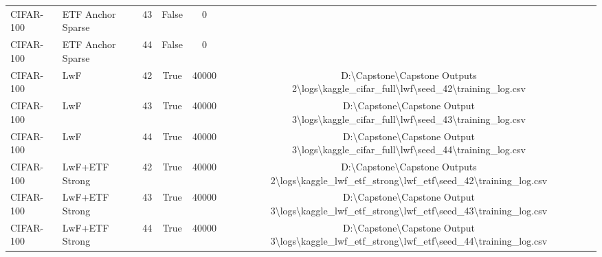 \begin{tabular}{llcccc}
CIFAR-100 & ETF Anchor Sparse & 43 & False & 0 &  \\
CIFAR-100 & ETF Anchor Sparse & 44 & False & 0 &  \\
CIFAR-100 & LwF & 42 & True & 40000 & D:\textbackslash{}Capstone\textbackslash{}Capstone Outputs 2\textbackslash{}logs\textbackslash{}kaggle\_cifar\_full\textbackslash{}lwf\textbackslash{}seed\_42\textbackslash{}training\_log.csv \\
CIFAR-100 & LwF & 43 & True & 40000 & D:\textbackslash{}Capstone\textbackslash{}Capstone Output 3\textbackslash{}logs\textbackslash{}kaggle\_cifar\_full\textbackslash{}lwf\textbackslash{}seed\_43\textbackslash{}training\_log.csv \\
CIFAR-100 & LwF & 44 & True & 40000 & D:\textbackslash{}Capstone\textbackslash{}Capstone Output 3\textbackslash{}logs\textbackslash{}kaggle\_cifar\_full\textbackslash{}lwf\textbackslash{}seed\_44\textbackslash{}training\_log.csv \\
CIFAR-100 & LwF+ETF Strong & 42 & True & 40000 & D:\textbackslash{}Capstone\textbackslash{}Capstone Outputs 2\textbackslash{}logs\textbackslash{}kaggle\_lwf\_etf\_strong\textbackslash{}lwf\_etf\textbackslash{}seed\_42\textbackslash{}training\_log.csv \\
CIFAR-100 & LwF+ETF Strong & 43 & True & 40000 & D:\textbackslash{}Capstone\textbackslash{}Capstone Output 3\textbackslash{}logs\textbackslash{}kaggle\_lwf\_etf\_strong\textbackslash{}lwf\_etf\textbackslash{}seed\_43\textbackslash{}training\_log.csv \\
CIFAR-100 & LwF+ETF Strong & 44 & True & 40000 & D:\textbackslash{}Capstone\textbackslash{}Capstone Output 3\textbackslash{}logs\textbackslash{}kaggle\_lwf\_etf\_strong\textbackslash{}lwf\_etf\textbackslash{}seed\_44\textbackslash{}training\_log.csv \\
\hline
\end{tabular}
